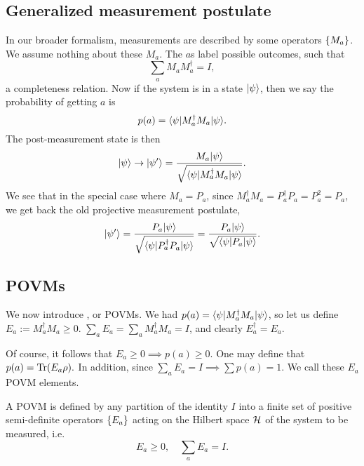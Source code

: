 \subsection*{Generalized measurement postulate}
In our broader formalism, measurements are described by some operators $\{M_a\}$. We assume nothing about these $M_a$. The $a$s label possible outcomes, such that
\begin{equation}
    \sum_a M_a M^\dagger_a = I,
\end{equation}
a completeness relation. Now if the system is in a state $\lvert\psi\rangle$, then we say the probability of getting $a$ is
\begin{equation}
    p(a) =\langle\psi\rvert M_a^\dagger M_a \lvert\psi\rangle.
\end{equation}
The post-measurement state is then
\begin{equation}
    \lvert\psi\rangle\to \lvert\psi'\rangle=\frac{M_a \lvert\psi\rangle}{\sqrt{\langle\psi\rvert M^\dagger_a M_a\lvert\psi\rangle}}.
\end{equation}
We see that in the special case where $M_a=P_a$, since $M_a^\dagger M_a = P_a^\dagger P_a = P_a^2 =P_a$, we get back the old projective measurement postulate,
\begin{equation*}
    \lvert\psi'\rangle=\frac{P_a \lvert\psi\rangle}{\sqrt{\langle\psi\rvert P^\dagger_a P_a\lvert\psi\rangle}}=\frac{P_a \lvert\psi\rangle}{\sqrt{\langle\psi\rvert P_a\lvert\psi\rangle}}.
\end{equation*}

\subsection*{POVMs}
We now introduce , or POVMs. We had $p(a)=\langle\psi\rvert M_a^\dagger M_a \lvert\psi\rangle$, so let us define $E_a := M_a ^\dagger M_a \geq 0$. $\sum_a E_a = \sum_a M_a^\dagger M_a =I$, and clearly $E_a^\dagger = E_a$.

Of course, it follows that $E_a \geq 0 \implies p(a) \geq 0$. One may define that $p(a)=\operatorname{Tr}(E_a \rho).$ In addition, since $\sum_a E_a=I\implies \sum p(a) =1$. We call these $E_a$ POVM elements.

\begin{defn}
    A POVM is defined by any partition of the identity $I$ into a finite set of positive semi-definite operators $\{E_a\}$ acting on the Hilbert space $\mathcal H$ of the system to be measured, i.e.
    \begin{equation*}
        E_a \geq 0, \quad \sum_a E_a = I.
    \end{equation*}
\end{defn}